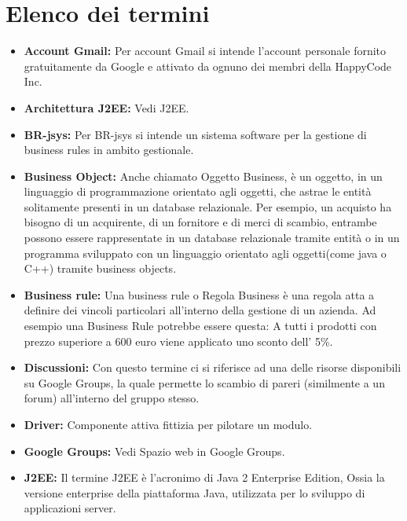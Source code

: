 \documentclass[11pt,titlepage,a4paper]{report}
\begin{document}
\chapter{Elenco dei termini}
\begin{itemize}

\item{\textbf{Account Gmail:}
Per account Gmail si intende l'account personale fornito gratuitamente da Google e attivato da ognuno dei membri della HappyCode Inc.}

\item{\textbf{Architettura J2EE:}
Vedi J2EE.}

\item{\textbf{BR-jsys:}
Per BR-jsys si intende un sistema software per la gestione di business rules in ambito gestionale.}

\item{\textbf{Business Object:}
Anche chiamato Oggetto Business, \`e un oggetto, in un linguaggio di programmazione orientato agli oggetti, che astrae le entit\`a solitamente presenti in un database relazionale.
Per esempio, un acquisto ha bisogno di un acquirente, di un fornitore e di merci di scambio, entrambe possono essere rappresentate in un database relazionale tramite entit\`a o in un programma sviluppato con un linguaggio orientato agli oggetti(come java o C++) tramite business objects.}

\item{\textbf{Business rule:}
Una business rule o Regola Business \`e una regola atta a definire dei vincoli particolari all'interno della gestione di un azienda. Ad esempio una Business Rule potrebbe essere questa: A tutti i prodotti con prezzo superiore a 600 euro  viene applicato uno sconto dell' 5\%.}

\item{\textbf{Discussioni:}
Con questo termine ci si riferisce ad una delle risorse disponibili su Google Groups, la quale permette lo scambio di pareri (similmente a un forum) all'interno del gruppo stesso.}

\item{\textbf{Driver:}
Componente attiva fittizia per pilotare un modulo.}

\item{\textbf{Google Groups:}
Vedi Spazio web in Google Groups. }

\item{\textbf{J2EE:}
Il termine J2EE \`e l'acronimo di Java 2 Enterprise Edition, Ossia la versione enterprise della piattaforma Java, utilizzata per lo sviluppo di applicazioni server.}


\end{itemize}
\end{document}
